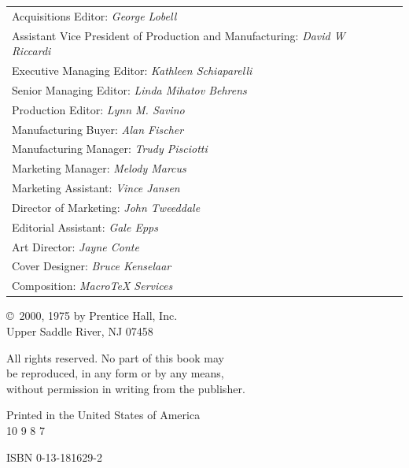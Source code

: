 \begin{flushleft}
\begin{tabular}{@{}l@{\hspace{0.5em}}l@{}}
Acquisitions Editor:  \textit{George Lobell} \\
Assistant Vice President of Production and Manufacturing: \textit{David W Riccardi} \\
Executive Managing Editor:  \textit{Kathleen Schiaparelli} \\
Senior Managing Editor:  \textit{Linda Mihatov Behrens} \\
Production Editor:  \textit{Lynn M. Savino} \\
Manufacturing Buyer:  \textit{Alan Fischer} \\
Manufacturing Manager:  \textit{Trudy Pisciotti} \\
Marketing Manager:  \textit{Melody Marcus} \\
Marketing Assistant:  \textit{Vince Jansen} \\
Director of Marketing:  \textit{John Tweeddale} \\
Editorial Assistant:  \textit{Gale Epps} \\
Art Director:  \textit{Jayne Conte} \\
Cover Designer:  \textit{Bruce Kenselaar} \\
Composition:  \textit{MacroTeX Services} \\
\end{tabular}

\vspace{1.5\baselineskip}
\end{flushleft}

\begin{flushleft}
\copyright\ 2000, 1975 by Prentice Hall, Inc. \\
Upper Saddle River, NJ 07458

\vspace{1.5\baselineskip}

All rights reserved. No part of this book may \\
be reproduced, in any form or by any means, \\
without permission in writing from the publisher.

\vspace{1.5\baselineskip}

Printed in the United States of America \\
10 9 8 7

\vspace{1.5\baselineskip}
{\ttfamily 
ISBN 0-13-181629-2}

\vspace{2\baselineskip}
\end{flushleft}

